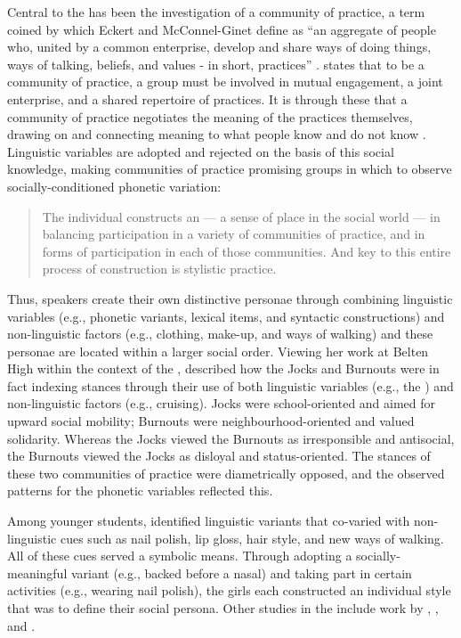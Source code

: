 Central to the  has been the investigation of a community of practice, a term coined by \citet{lavewenger1991} which Eckert and McConnel-Ginet define as ``an aggregate of people who, united by a common enterprise, develop and share ways of doing things, ways of talking, beliefs, and values - in short, practices'' \citep[186]{eckertmcconnellginet1999}. \citet{wenger1998} states that to be a community of practice, a group must be involved in mutual engagement, a joint enterprise, and a shared repertoire of practices. It is through these that a community of practice negotiates the meaning of the practices themselves, drawing on and connecting meaning to what people know and do not know \citep[73-85]{wenger1998}. Linguistic variables are adopted and rejected on the basis of this social knowledge, making communities of practice promising groups in which to observe socially-conditioned phonetic variation:


\begin{quote}
The individual constructs an  --- a sense of place in the social world --- in balancing participation in a variety of communities of practice, and in forms of participation in each of those communities. And key to this entire process of construction is stylistic practice. \citep[17]{eckert2005}
\end{quote}

\noindent Thus, speakers create their own distinctive personae through combining linguistic variables (e.g., phonetic variants, lexical items, and syntactic constructions) and non-linguistic factors (e.g., clothing, make-up, and ways of walking) and these personae are located within a larger social order. Viewing her work at Belten High within the context of the , \citet{eckert2005} described how the Jocks and Burnouts were in fact indexing stances through their use of both linguistic variables (e.g., the  ) and non-linguistic factors (e.g., cruising). Jocks were school-oriented and aimed for upward social mobility; Burnouts were neighbourhood-oriented and valued solidarity. Whereas the Jocks viewed the Burnouts as irresponsible and antisocial, the Burnouts viewed the Jocks as disloyal and status-oriented. \noindent The stances of these two communities of practice were diametrically opposed, and the observed patterns for the phonetic variables reflected this.

Among younger students, \citet{eckert1996nailpolish} identified linguistic variants that co-varied with non-linguistic cues such as nail polish, lip gloss, hair style, and new ways of walking. All of these cues served a symbolic means. Through adopting a socially-meaningful variant (e.g., backed \textipa{/\ae/} before a nasal) and taking part in certain activities (e.g., wearing nail polish), the girls each constructed an individual style that was to define their social persona. Other studies in the  include work by \citet{mendozadenton2008}, \citet{zhang2005}, and \citet{podesva2011}.

